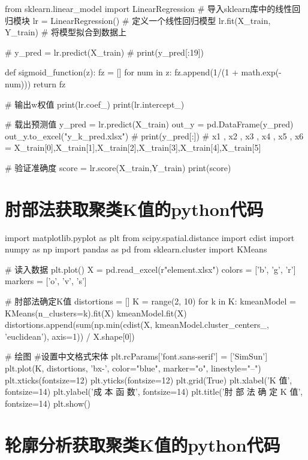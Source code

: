 \documentclass[withoutpreface,bwprint]{cumcmthesis} %
\begin{document}
\begin{appendices}
\begin{python}
	from sklearn.linear_model import LinearRegression # 导入sklearn库中的线性回归模块
	lr = LinearRegression()                           # 定义一个线性回归模型
	lr.fit(X_train, Y_train)                          # 将模型拟合到数据上
	
	# y_pred = lr.predict(X_train)
	# print(y_pred[:19])
	
	def sigmoid_function(z):
	fz = []
	for num in z:
	fz.append(1/(1 + math.exp(-num)))
	return fz
	
	# 输出w权值
	print(lr.coef_)
	print(lr.intercept_)
	
	# 载出预测值
	y_pred = lr.predict(X_train)
	out_y = pd.DataFrame(y_pred)
	out_y.to_excel("y_k_pred.xlsx")
	# print(y_pred[:])
	# x1 , x2 , x3 , x4 , x5 , x6 = X_train[0],X_train[1],X_train[2],X_train[3],X_train[4],X_train[5]
	
	# 验证准确度
	score = lr.score(X_train,Y_train)
	print(score)
\end{python}

\section{肘部法获取聚类K值的python代码}

\begin{python}
	import matplotlib.pyplot as plt
	from scipy.spatial.distance import cdist
	import numpy as np
	import pandas as pd
	from sklearn.cluster import KMeans
	
	
	# 读入数据
	plt.plot()
	X = pd.read_excel(r"element.xlsx")
	colors = ['b', 'g', 'r']
	markers = ['o', 'v', 's']
	
	# 肘部法确定K值
	distortions = []
	K = range(2, 10)
	for k in K:
	kmeanModel = KMeans(n_clusters=k).fit(X)
	kmeanModel.fit(X)
	distortions.append(sum(np.min(cdist(X, kmeanModel.cluster_centers_, 'euclidean'), axis=1)) / X.shape[0])
	
	# 绘图
	#设置中文格式宋体
	plt.rcParams['font.sans-serif'] = ['SimSun']
	plt.plot(K, distortions, 'bx-',  color="blue", marker="o", linestyle="--")
	plt.xticks(fontsize=12)
	plt.yticks(fontsize=12)
	plt.grid(True)
	plt.xlabel('K  值', fontsize=14)
	plt.ylabel('成 本 函 数', fontsize=14)
	plt.title('肘 部 法 确 定 K 值', fontsize=14)
	plt.show()
\end{python}

\section{轮廓分析获取聚类K值的python代码}


\end{appendices}
\end{document}
